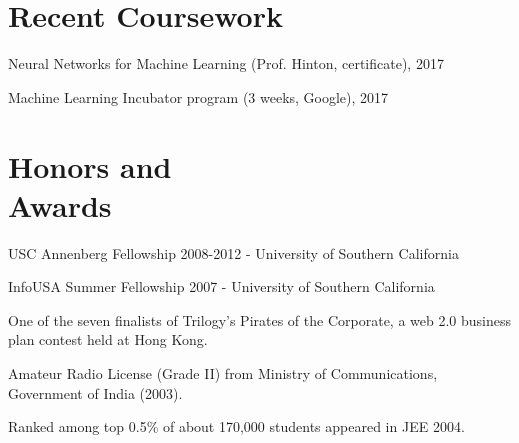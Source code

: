 \documentclass[margin,line]{resume}
\begin{document}
\begin{resume}
\section{\mysidestyle Recent Coursework} 
\begin{list2}
\item Neural Networks for Machine Learning (Prof. Hinton, certificate), 2017
\item Machine Learning Incubator program (3 weeks, Google), 2017
\end{list2}



    
\section{\mysidestyle Honors and\\Awards} 
\begin{list2}
	  \item USC Annenberg Fellowship 2008-2012	- University of Southern California
          \item InfoUSA Summer Fellowship 2007	- University of Southern California %
	  \item One of the seven finalists of Trilogy's Pirates of the Corporate, a web 2.0 business plan contest held at Hong Kong. %
	  \item Amateur Radio License (Grade II) from Ministry of Communications, Government of India (2003).%
	  \item Ranked among top 0.5\% of about 170,000 students appeared in JEE 2004. \\%
\end{list2}
  
\end{resume}
\end{document}
